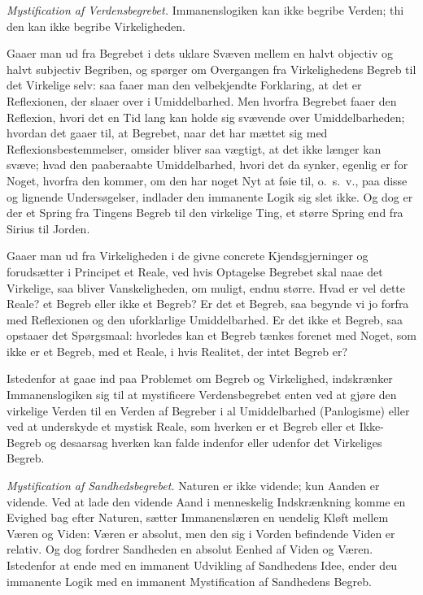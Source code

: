\documentclass[12pt]{book}
\newcommand{\opage}[1]{\marginnote{\footnotesize\textit{[#1]}}}
\begin{document}
\emph{Mystification af Verdensbegrebet.}
Immanenslogiken kan ikke begribe Verden; thi den kan ikke begribe
Virkeligheden.

Gaaer man ud fra Begrebet i dets uklare Svæven mellem en halvt
objectiv og halvt subjectiv Begriben, og spørger om Overgangen fra
Virkelighedens Begreb til det Virkelige selv: saa faaer man den
velbekjendte Forklaring, at det er Reflexionen, der slaaer over i
Umiddelbarhed. Men hvorfra Begrebet faaer den Reflexion, hvori det
en Tid lang kan holde sig svævende over Umiddelbarheden; hvordan det
gaaer til, at Begrebet, naar det har mættet sig med
Reflexionsbestemmelser, omsider bliver saa vægtigt, at det ikke
længer kan svæve; hvad den paaberaabte Umiddelbarhed, hvori det da
synker, egenlig er for Noget, hvorfra den kommer, om den har noget
Nyt at føie til, o.~s.~v., paa disse og lignende Undersøgelser,
indlader den immanente Logik
\opage{89} sig slet ikke. Og dog er der et Spring fra Tingens Begreb til den
virkelige Ting, et større Spring end fra Sirius til Jorden.

Gaaer man ud fra Virkeligheden i de givne concrete Kjendsgjerninger
og forudsætter i Principet et Reale, ved hvis Optagelse Begrebet
skal naae det Virkelige, saa bliver Vanskeligheden, om muligt, endnu
større. Hvad er vel dette Reale? et Begreb eller ikke et Begreb? Er
det et Begreb, saa begynde vi jo forfra med Reflexionen og den
uforklarlige Umiddelbarhed. Er det ikke et Begreb, saa opstaaer det
Spørgsmaal: hvorledes kan et Begreb tænkes forenet med Noget, som
ikke er et Begreb, med et Reale, i hvis Realitet, der intet Begreb
er?

Istedenfor at gaae ind paa Problemet om Begreb og Virkelighed,
indskrænker Immanenslogiken sig til at mystificere Verdensbegrebet
enten ved at gjøre den virkelige Verden til en Verden af Begreber i
al Umiddelbarhed (Panlogisme) eller ved at underskyde et mystisk
Reale, som hverken er et Begreb eller et Ikke-Begreb og desaarsag
hverken kan falde indenfor eller udenfor det Virkeliges Begreb.

\emph{Mystification af Sandhedsbegrebet.}
Naturen er ikke vidende; kun Aanden er vidende. Ved at lade den
vidende Aand i menneskelig Indskrænkning komme en Evighed bag efter
Naturen, sætter Immanenslæren en uendelig Kløft mellem Væren og
Viden: Væren er absolut, men den sig i Vorden befindende Viden er
relativ. Og dog fordrer Sandheden en absolut Eenhed af Viden og
Væren. Istedenfor at ende med en immanent Udvikling af Sandhedens
Idee, ender deu immanente Logik med en immanent Mystification af
Sandhedens Begreb.
\end{document}

